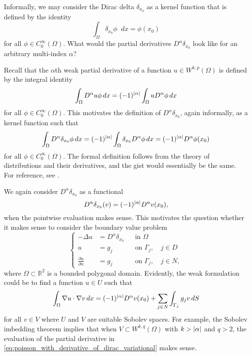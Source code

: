 \documentclass[english, 12pt, a4paper, sci, utf8, a-2b, online]{aaltothesis}
\theoremstyle{definition}
\theoremstyle{plain}
\DeclarePairedDelimiter\abs{\lvert}{\rvert}
\newcommand*\diff{\mathop{}\!d}
\numberwithin{equation}{section}
\begin{document}
Informally, we may consider the Dirac delta $\delta_{x_0}$ as a kernel function
that is defined by the identity
\begin{equation*}
    \int_{\Omega} \delta_{x_0} \phi \diff x = \phi(x_0)
\end{equation*}
for all $\phi \in C_0^{\infty}(\Omega)$.
What would the partial derivatives $D^{\alpha} \delta_{x_0}$ look like
for an arbitrary multi-index $\alpha$?

Recall that the $\alpha$th weak partial derivative
of a function $u \in W^{k,p}(\Omega)$ is defined by the integral identity
\begin{equation*}
    \int_{\Omega} D^{\alpha} u \phi \diff x
    = (-1)^{\abs{\alpha}} \int_{\Omega} u D^{\alpha} \phi \diff x
\end{equation*}
for all $\phi \in C_0^{\infty}(\Omega)$.
This motivates the definition of $D^{\alpha} \delta_{x_0}$, again informally,
as a kernel function such that
\begin{equation*}
    \int_{\Omega} D^{\alpha} \delta_{x_0} \phi \diff x
    = (-1)^{\abs{\alpha}} \int_{\Omega} \delta_{x_0} D^{\alpha} \phi \diff x
    = (-1)^{\abs{\alpha}} D^{\alpha} \phi(x_0)
\end{equation*}
for all $\phi \in C_0^{\infty}(\Omega)$.
The formal definition follows from the theory of distributions
and their derivatives, and the gist would essentially be the same.
For reference, see \cite[Chapter 6]{rudin1991}.

We again consider $D^{\alpha} \delta_{x_0}$ as a functional
\begin{equation*}
    D^{\alpha} \delta_{x_0}(v) = (-1)^{\abs{\alpha}} D^{\alpha} v(x_0),
\end{equation*}
when the pointwise evaluation makes sense.
This motivates the question whether it makes sense to consider the
boundary value problem
\begin{equation}
    \label{eq:poisson_with_derivative_of_dirac}
    \left\{
        \begin{aligned}
            -\Delta u &= D^{\alpha} \delta_{x_0} && \text{in } \Omega \\
            u &= g_j && \text{on } \Gamma_j, \quad j \in D \\
            \frac{\partial u}{\partial n} &= g_j && \text{on } \Gamma_j,
            \quad j \in N,
        \end{aligned}
    \right.
\end{equation}
where $\Omega \subset \mathbb{R}^2$ is a bounded polygonal domain.
Evidently, the weak formulation could be to find a function $u \in U$ such that
\begin{equation}
    \label{eq:poisson_with_derivative_of_dirac_variational}
    \int_{\Omega} \nabla u \cdot \nabla v \diff x
    = (-1)^{\abs{\alpha}} D^{\alpha} v(x_0)
        + \sum_{j \in N} \int_{\Gamma_j} g_j v \diff S
\end{equation}
for all $v \in V$ where $U$ and $V$ are suitable Sobolev spaces.
For example, the Sobolev imbedding theorem implies that
when $V \subset W^{k,q}(\Omega)$ with $k > \abs{\alpha}$ and $q > 2$,
the evaluation of the partial derivative in 
\eqref{eq:poisson_with_derivative_of_dirac_variational} makes sense.
\end{document}
